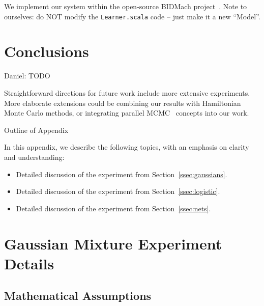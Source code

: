 \documentclass{article}
\begin{document}
We implement our system within the open-source BIDMach project~\cite{canny2013bidmach}. Note to
ourselves: do NOT modify the \texttt{Learner.scala} code -- just make it a new ``Model''.




\section{Conclusions}\label{sec:conclusion}

{\color{blue}
Daniel: TODO
}

Straightforward directions for future work include more extensive experiments. More elaborate
extensions could be combining our results with Hamiltonian Monte Carlo methods, or integrating
parallel MCMC~\cite{conf/uai/AngelinoKWSA14} concepts into our work.


\small


\normalsize

\clearpage
\appendix

\begin{center}
{\Large Outline of Appendix}
\end{center}

In this appendix, we describe the following topics, with an emphasis on clarity and understanding:

\begin{itemize}[noitemsep]
    \item Detailed discussion of the experiment from Section~\ref{ssec:gaussians}.
    \item Detailed discussion of the experiment from Section~\ref{ssec:logistic}.
    \item Detailed discussion of the experiment from Section~\ref{ssec:nets}.
\end{itemize}

\section{Gaussian Mixture Experiment Details}\label{app:gaussian}

\subsection{Mathematical Assumptions}
\end{document}
